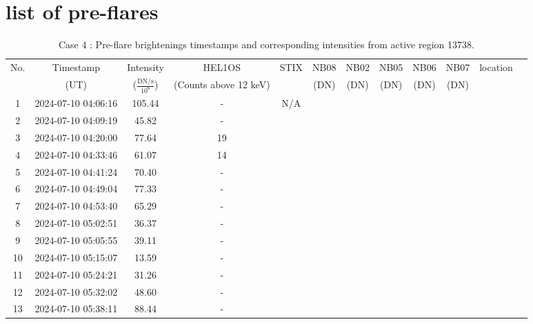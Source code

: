 \documentclass[fleqn,usenatbib]{mnras}
\begin{document}






\appendix

\section{list of pre-flares}
\begin{table}
    \centering
    \caption{Case 4 : Pre-flare brightenings timestamps and corresponding intensities from active region 13738.}
    \begin{tabular}{cccccccccccc}
        \hline
        No. & Timestamp & Intensity & HEL1OS & STIX & NB08 & NB02 & NB05 & NB06 & NB07 & location\\
        &(UT) &  ($\frac{\mathrm{DN/s}} {10^6}$) & (Counts above 12 keV) & & (DN)& (DN)& (DN)& (DN) & (DN)\\
        \hline
      1&  2024-07-10 04:06:16 & 105.44 & - & N/A \\
	  2& 2024-07-10 04:09:19 & 45.82 & -  \\
	  3& 2024-07-10 04:20:00 & 77.64 & 19 \\
	  4& 2024-07-10 04:33:46 & 61.07 & 14 \\
	  5& 2024-07-10 04:41:24 & 70.40 & -  \\
	  6& 2024-07-10 04:49:04 & 77.33 & -  \\
	  7& 2024-07-10 04:53:40 & 65.29 & -  \\
	  8& 2024-07-10 05:02:51 & 36.37 & -  \\
	  9& 2024-07-10 05:05:55 & 39.11 & -  \\
	  10& 2024-07-10 05:15:07 & 13.59 & -  \\
	  11& 2024-07-10 05:24:21 & 31.26 & -  \\
	  12& 2024-07-10 05:32:02 & 48.60 & -  \\
	  13& 2024-07-10 05:38:11 & 88.44 & -  \\

       \hline
    \end{tabular}
\end{table}
\end{document}
